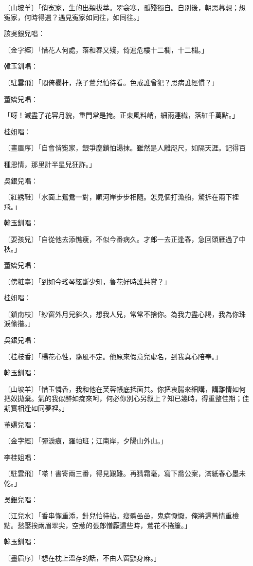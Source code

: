 \begin{showcontents}{}
〔山坡羊〕「俏寃家，生的出類拔萃。翠衾寒，孤殘獨自。自別後，朝思暮想；想寃家，何時得遇？遇見寃家如同往，如同往。」

該吳銀兒唱：

〔金字經〕「惜花人何處，落和春又殘，倚遍危樓十二欄，十二欄。」

韓玉釧唱：

〔駐雲飛〕「悶倚欄杆，燕子鶯兒怕待看。色戒誰曾犯？思病誰經慣？」

董嬌兒唱：

「呀！減盡了花容月貌，重門常是掩。正東風料峭，細雨連纎，落紅千萬點。」

桂姐唱：

〔畫眉序〕「自會俏寃家，銀爭塵鎖怕湯抹。雖然是人離咫尺，如隔天涯。記得百

種恩情，那里計半星兒狂詐。」

吳銀兒唱：

〔紅綉鞋〕「水面上鴛鴦一對，順河岸步步相隨。怎見個打漁船，驚拆在兩下裡飛。」

韓玉釧唱：

〔耍孩兒〕「自從他去添憔瘦，不似今番病久。才郎一去正逢春，急回頭雁過了中秋。」

董嬌兒唱：

〔傍粧臺〕「到如今瑤琴絃斷少知，魯花好時誰共賞？」

桂姐唱：

〔鎖南枝〕「紗窗外月兒斜久，想我人兒，常常不捨你。為我力盡心謁，我為你珠淚偷揩。」

吳銀兒唱：

〔桂枝香〕「楊花心性，隨風不定。他原來假意兒虛名，到我真心陪奉。」

韓玉釧唱：

〔山坡羊〕「惜玉憐香，我和他在芙蓉帳底抵面共。你把衷腸來細講，講離情如何把奴拋棄。氣的我似醉如痴來呵，何必你別心另叙上？知已幾時，得重整佳期；佳期實相逢如同夢裡。」

董嬌兒唱：

〔金字經〕「彈淚痕，羅帕班；江南岸，夕陽山外山。」

李桂姐唱：

〔駐雲飛〕「嗏！書寄兩三番，得見艱難。再猜霜毫，寫下喬公案，滿紙春心墨未乾。」

吳銀兒唱：

〔江兒水〕「香串懶重添，針兒怕待拈。瘦體嵒嵒，鬼病懨懨，俺將這舊情重檢點。愁壓挨兩眉翠尖，空惹的張郎憎厭這些時，鶯花不捲簾。」

韓玉釧唱：

〔畫眉序〕「想在枕上溫存的話，不由人窗顫身麻。」


\end{showcontents}
